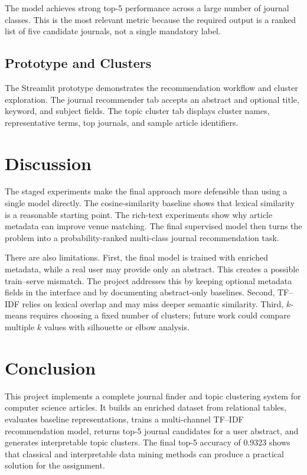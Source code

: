 \documentclass[conference]{IEEEtran}
\begin{document}
The model achieves strong top-5 performance across a large number of journal classes. This is the most relevant metric because the required output is a ranked list of five candidate journals, not a single mandatory label.

\subsection{Prototype and Clusters}
The Streamlit prototype demonstrates the recommendation workflow and cluster exploration. The journal recommender tab accepts an abstract and optional title, keyword, and subject fields. The topic cluster tab displays cluster names, representative terms, top journals, and sample article identifiers.

\section{Discussion}
The staged experiments make the final approach more defensible than using a single model directly. The cosine-similarity baseline shows that lexical similarity is a reasonable starting point. The rich-text experiments show why article metadata can improve venue matching. The final supervised model then turns the problem into a probability-ranked multi-class journal recommendation task.

There are also limitations. First, the final model is trained with enriched metadata, while a real user may provide only an abstract. This creates a possible train--serve mismatch. The project addresses this by keeping optional metadata fields in the interface and by documenting abstract-only baselines. Second, TF--IDF relies on lexical overlap and may miss deeper semantic similarity. Third, $k$-means requires choosing a fixed number of clusters; future work could compare multiple $k$ values with silhouette or elbow analysis.

\section{Conclusion}
This project implements a complete journal finder and topic clustering system for computer science articles. It builds an enriched dataset from relational tables, evaluates baseline representations, trains a multi-channel TF--IDF recommendation model, returns top-5 journal candidates for a user abstract, and generates interpretable topic clusters. The final top-5 accuracy of 0.9323 shows that classical and interpretable data mining methods can produce a practical solution for the assignment.
\end{document}
